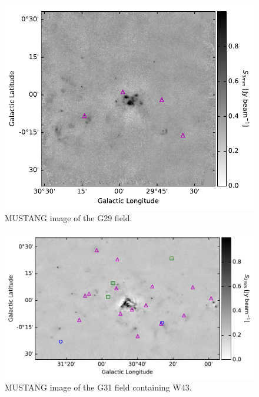 \documentclass[twocolumn]{aastex62}
\begin{document}
\begin{figure}[htp]
\includegraphics[width=17cm]{figures/G29_overview_withcatalog.pdf}
\caption{MUSTANG image of the G29 field.}
\label{fig:g29overview}
\end{figure}


\begin{figure}[htp]
    \includegraphics[width=17cm]{figures/G31_overview_withcatalog.pdf}
\caption{MUSTANG image of the G31 field containing W43.
}
\label{fig:w43overview}
\end{figure}
\end{document}
